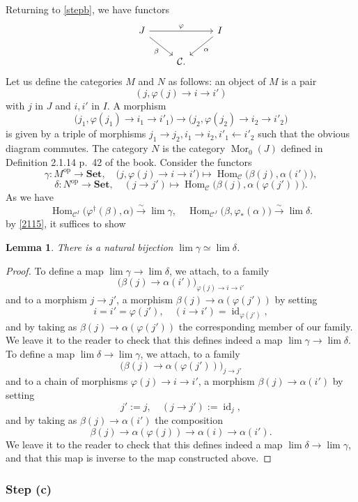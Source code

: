 \documentclass[12pt]{article}
\newtheorem{lem}[thm]{Lemma}
\theoremstyle{remark}
\theoremstyle{definition}
\newcommand{\C}{\mathcal C}
\newcommand{\Set}{\mathbf{Set}}
\newcommand{\pp}{\varphi}
\newcommand{\xr}{\xrightarrow}
\DeclareMathOperator{\id}{id}
\DeclareMathOperator{\Hom}{Hom}
\DeclareMathOperator{\Mor}{Mor}
\DeclareMathOperator{\op}{op}
\begin{document}
Returning to \eqref{stepb}, we have functors 
$$
\begin{tikzcd}
J\ar{rr}{\pp}\ar{dr}[swap]{\beta}&&I\ar{dl}{\alpha}\\ 
&\C.
\end{tikzcd}
$$ 
Let us define the categories $M$ and $N$ as follows: an object of $M$ is a pair 
$$
(j,\pp(j)\to i\to i')
$$ 
with $j$ in $J$ and $i,i'$ in $I$. A morphism 
$$
\Big(j_1,\pp(j_1)\to i_1\to i'_1\Big)\to\Big(j_2,\pp(j_2)\to i_2\to i'_2\Big)
$$ 
is given by a triple of morphisms $j_1\to j_2,i_1\to i_2,i'_1\leftarrow i'_2$ such that the obvious diagram commutes. The category $N$ is the category $\Mor_0(J)$ defined in Definition 2.1.14 p.~42 of the book. Consider the functors 
$$
\gamma:M^{\op}\to\Set,\quad\Big(j,\pp(j)\to i\to i'\Big)\mapsto\Hom_\C\big(\beta(j),\alpha(i')\big), 
$$ 
$$
\delta:N^{\op}\to\Set,\quad(j\to j')\mapsto\Hom_\C\big(\beta(j),\alpha(\pp(j'))\big). 
$$ 
As we have 
$$
\Hom_{\C^I}\big(\pp^\dagger(\beta),\alpha\big)\xr\sim\lim\gamma,\quad
\Hom_{\C^J}\big(\beta,\pp_*(\alpha)\big)\xr\sim\lim\delta. 
$$ 
by \eqref{2115}, it suffices to show 
%
\begin{lem}
%
There is a natural bijection $\lim\gamma\simeq\lim\delta$. 
%
\end{lem} 
%
\begin{proof}
To define a map $\lim\gamma\to\lim\delta$, we attach, to a family 
$$
\big(\beta(j)\to\alpha(i')\big)_{\pp(j)\to i\to i'}
$$ 
and to a morphism $j\to j'$, a morphism $\beta(j)\to\alpha(\pp(j'))$ by setting 
$$
i=i'=\pp(j'),\quad(i\to i')=\id_{\pp(j')},
$$ 
and by taking as $\beta(j)\to\alpha(\pp(j'))$ the corresponding member of our family. We leave it to the reader to check that this defines indeed a map $\lim\gamma\to\lim\delta$. To define a map $\lim\delta\to\lim\gamma$, we attach, to a family 
$$
\big(\beta(j)\to\alpha(\pp(j'))\big)_{j\to j'}
$$ 
and to a chain of morphisms $\pp(j)\to i\to i'$, a morphism $\beta(j)\to\alpha(i')$ by setting 
$$
j':=j,\quad(j\to j'):=\id_{j},
$$ 
and by taking as $\beta(j)\to\alpha(i')$ the composition 
$$
\beta(j)\to\alpha(\pp(j))\to\alpha(i)\to\alpha(i'). 
$$ 
We leave it to the reader to check that this defines indeed a map $\lim\delta\to\lim\gamma$, and that this map is inverse to the map constructed above.
\end{proof}
%
\subsubsection{Step (c)}
\end{document}
